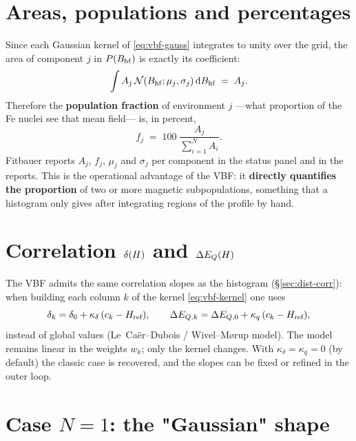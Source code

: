 \section{Areas, populations and percentages}
\label{sec:vbf-areas2}

Since each Gaussian kernel of \eqref{eq:vbf-gauss} integrates to unity over the
grid, the area of component $j$ in $P(B_{\mathrm{hf}})$ is exactly its coefficient:
\begin{equation}
  \int A_j\,\mathcal N(B_{\mathrm{hf}};\mu_j,\sigma_j)\,\mathrm{d}B_{\mathrm{hf}} \;=\; A_j .
\end{equation}
Therefore the \textbf{population fraction} of environment $j$ —what proportion of
the Fe nuclei see that mean field— is, in percent,
\begin{equation}
  f_j \;=\; 100\;\frac{A_j}{\sum_{i=1}^{N} A_i}.
  \label{eq:vbf-pop}
\end{equation}
Fitbauer reports $A_j$, $f_j$, $\mu_j$ and $\sigma_j$ per component in the status
panel and in the reports. This is the operational advantage of the VBF: it
\textbf{directly quantifies the proportion} of two or more magnetic
subpopulations, something that a histogram only gives after integrating regions of
the profile by hand.

\section{Correlation \texorpdfstring{$\delta(H)$}{d(H)} and \texorpdfstring{$\Delta E_{Q}(H)$}{DEQ(H)}}
\label{sec:vbf-corr}

The VBF admits the same correlation slopes as the histogram
(\S\ref{sec:dist-corr}): when building each column $k$ of the kernel
\eqref{eq:vbf-kernel} one uses
\begin{equation}
  \delta_k = \delta_0 + \kappa_\delta\,(c_k - H_{\text{ref}}),\qquad
  \Delta E_{Q,k} = \Delta E_{Q,0} + \kappa_q\,(c_k - H_{\text{ref}}),
\end{equation}
instead of global values (Le~Caër--Dubois / Wivel--M\o{}rup model). The model
remains linear in the weights $w_k$; only the kernel changes. With
$\kappa_\delta=\kappa_q=0$ (by default) the classic case is recovered, and the
slopes can be fixed or refined in the outer loop.

\section{Case \texorpdfstring{$N=1$}{N=1}: the "Gaussian" shape}
\label{sec:vbf-gaussiana}


